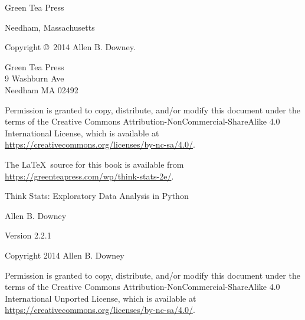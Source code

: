 \documentclass[12pt]{book}
\newcommand{\thetitle}{Think Stats}
\newcommand{\thesubtitle}{Exploratory Data Analysis in Python}
\newcommand{\theversion}{2.2.1}
\begin{document}
\begin{latexonly}
\begin{flushright}
{\Large Green Tea Press}

{\small Needham, Massachusetts}

\vfill

\end{flushright}


\pagebreak
\thispagestyle{empty}

Copyright \copyright ~2014 Allen B. Downey.


\vspace{0.2in}

\begin{flushleft}
Green Tea Press       \\
9 Washburn Ave \\
Needham MA 02492
\end{flushleft}

Permission is granted to copy, distribute, and/or modify this document
under the terms of the Creative Commons
Attribution-NonCommercial-ShareAlike 4.0 International License, which
is available at
\url{https://creativecommons.org/licenses/by-nc-sa/4.0/}.


The \LaTeX\ source for this book is available from
\url{https://greenteapress.com/wp/think-stats-2e/}.

\vspace{0.2in}

\end{latexonly}



\begin{htmlonly}


{\Large \thetitle: \thesubtitle}

{\large Allen B. Downey}

Version \theversion

\vspace{0.25in}

Copyright 2014 Allen B. Downey

\vspace{0.25in}

Permission is granted to copy, distribute, and/or modify this document
under the terms of the Creative Commons 
Attribution-NonCommercial-ShareAlike 4.0 International
Unported License, which is available at
\url{https://creativecommons.org/licenses/by-nc-sa/4.0/}.

\setcounter{chapter}{-1}

\end{htmlonly}
\end{document}

